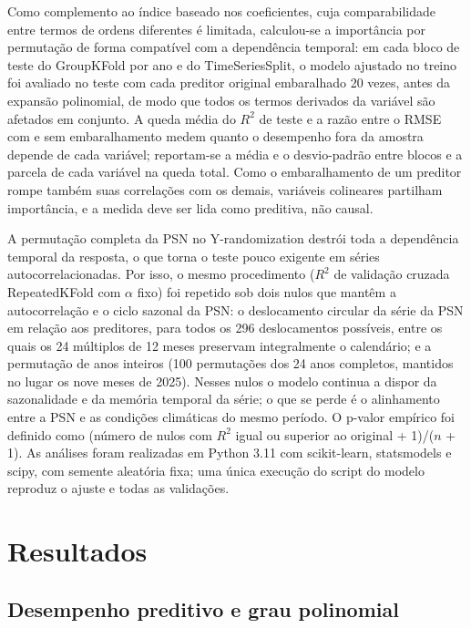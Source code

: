 \documentclass[a4paper,fleqn]{cas-sc}
\begin{document}
Como complemento ao índice baseado nos coeficientes, cuja comparabilidade entre termos de ordens diferentes é limitada, calculou-se a importância por permutação \citep{breiman2001} de forma compatível com a dependência temporal: em cada bloco de teste do GroupKFold por ano e do TimeSeriesSplit, o modelo ajustado no treino foi avaliado no teste com cada preditor original embaralhado 20 vezes, antes da expansão polinomial, de modo que todos os termos derivados da variável são afetados em conjunto. A queda média do $R^2$ de teste e a razão entre o RMSE com e sem embaralhamento medem quanto o desempenho fora da amostra depende de cada variável; reportam-se a média e o desvio-padrão entre blocos e a parcela de cada variável na queda total. Como o embaralhamento de um preditor rompe também suas correlações com os demais, variáveis colineares partilham importância, e a medida deve ser lida como preditiva, não causal.

A permutação completa da PSN no Y-randomization destrói toda a dependência temporal da resposta, o que torna o teste pouco exigente em séries autocorrelacionadas. Por isso, o mesmo procedimento ($R^2$ de validação cruzada RepeatedKFold com $\alpha$ fixo) foi repetido sob dois nulos que mantêm a autocorrelação e o ciclo sazonal da PSN: o deslocamento circular da série da PSN em relação aos preditores, para todos os 296 deslocamentos possíveis, entre os quais os 24 múltiplos de 12 meses preservam integralmente o calendário; e a permutação de anos inteiros (100 permutações dos 24 anos completos, mantidos no lugar os nove meses de 2025). Nesses nulos o modelo continua a dispor da sazonalidade e da memória temporal da série; o que se perde é o alinhamento entre a PSN e as condições climáticas do mesmo período. O p-valor empírico foi definido como (número de nulos com $R^2$ igual ou superior ao original + 1)/($n$ + 1). As análises foram realizadas em Python 3.11 com scikit-learn, statsmodels e scipy, com semente aleatória fixa; uma única execução do script do modelo reproduz o ajuste e todas as validações.

\section{Resultados}\label{sec:results}

\subsection{Desempenho preditivo e grau polinomial}
\end{document}
